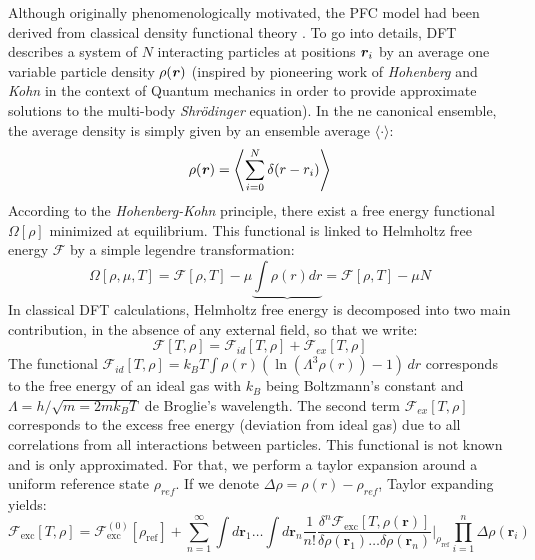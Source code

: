 \documentclass[11pt]{article}
\begin{document}
Although originally phenomenologically motivated, the PFC model had been derived from classical density functional theory \parencite{archerDerivingphase2019} \parencite{wuPhasefieldcrystal2007}. To go into details, DFT describes a system of $N$ interacting particles at positions $\bm{\mathit{r}}_i$ by an average one variable particle density $\rho(\bm{\mathit{r}})$ (inspired by pioneering work of \emph{Hohenberg} and \emph{Kohn} in the context of Quantum mechanics in order to provide approximate solutions to the multi-body \emph{Shrödinger} equation). In the ne canonical ensemble, the average density is simply given by an ensemble average $\langle \cdot \rangle$:
\begin{equation}
    \rho(\bm{\mathit{r}})= \left\langle \sum_{i=0}^{N} \delta(r-r_i) \right\rangle
\end{equation}
According to the \emph{Hohenberg-Kohn} principle, there exist a free energy functional $\Omega[\rho]$ minimized at equilibrium. This functional is linked to Helmholtz free energy $\mathcal{F}$ by a simple legendre transformation:
\begin{equation}
    \Omega[\rho,\mu,T] = \mathcal{F}[\rho,T] - \mu \underbrace{\int \rho (r) dr } = \mathcal{F}[\rho,T] - \mu N
\end{equation} 
In classical DFT calculations, Helmholtz free energy is decomposed into two main contribution, in the absence of any external field, so that we write:
\begin{equation}
    \mathcal{F}[T,\rho] =\mathcal{F}_{id}[T,\rho]+\mathcal{F}_{ex}[T,\rho]
\end{equation}
The functional $\mathcal{F}_{id}[T,\rho]= k_BT \int \rho(r) \left( \ln(\Lambda^3 \rho(r))-1\right) \, dr$ corresponds to  the free energy of an ideal gas with $k_B$ being Boltzmann's constant and  $\Lambda = h/\sqrt{m=2mk_BT}$ de Broglie's wavelength. The second term $\mathcal{F}_{ex}[T,\rho]$ corresponds to the excess free energy (deviation from ideal gas) due to all correlations from all interactions between particles. This functional is not known and is only approximated. For that, we perform a taylor expansion around a uniform reference state $\rho_{ref}$. If we denote $\Delta \rho = \rho(r)-\rho_{ref}$, Taylor expanding yields:
\begin{equation}
    \mathcal{F}_{\text{exc}}[T, \rho] = \mathcal{F}^{(0)}_{\text{exc}}[\rho_{\text{ref}}] + \sum_{n=1}^{\infty} \int d\mathbf{r}_1 \dots \int d\mathbf{r}_n \frac{1}{n!} \frac{\delta^n \mathcal{F}_{\text{exc}}[T, \rho(\mathbf{r})]}{\delta \rho(\mathbf{r}_1) \dots \delta \rho(\mathbf{r}_n)} \bigg|_{\rho_{\text{ref}}} \prod_{i=1}^{n} \Delta \rho(\mathbf{r}_i)
\end{equation}
\end{document}
